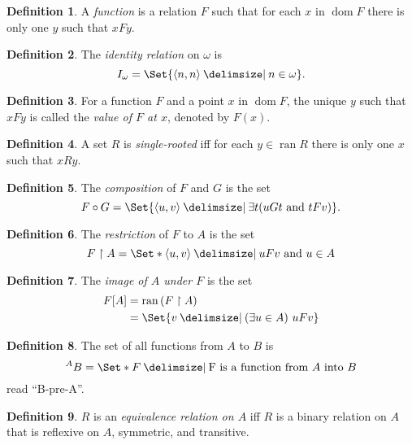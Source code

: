 \documentclass[12pt]{article}
\theoremstyle{plain}
\theoremstyle{remark}
\theoremstyle{definition}
\newtheorem{defn}{Definition}[section]
\theoremstyle{remark}
\providecommand\st{}
\newcommand\SetSymbol[1][]{%
  \nonscript\:#1\vert%
  \allowbreak%
  \nonscript\:
\mathopen{}}
\DeclarePairedDelimiter{\ang}{\langle}{\rangle}
\renewcommand\st{\SetSymbol[\delimsize]}
\DeclareMathOperator{\dom}{dom}
\DeclareMathOperator{\ran}{ran}
\begin{document}
\begin{defn}
  A \textit{function} is a relation $F$ such that for each $x$ in $\dom F$ there is only one $y$ such that $xFy$.
\end{defn}

\begin{defn}
  The \textit{identity relation} on $\omega$ is
  \[
  I_\omega = \Set{\ang{n,n} \st n \in \omega}.
  \]
\end{defn}

\begin{defn}
  For a function $F$ and a point $x$ in $\dom F$, the unique $y$ such that $xFy$ is called the \textit{value of $F$ at $x$}, denoted by $F(x)$.
\end{defn}

\begin{defn}
  A set $R$ is \textit{single-rooted} iff for each $y \in \ran R$ there is only one $x$ such that $xRy$.
\end{defn}

\begin{defn}
  The \textit{composition} of $F$ and $G$ is the set
  \[
    F \circ G = \Set{\ang{u, v} \st \exists t (uGt \text{ and } tFv)}.
  \]
\end{defn}

\begin{defn}
  The \textit{restriction} of $F$ to $A$ is the set
  \[
    F \restriction A = \Set*{\ang{u,v} \st uFv \text{ and } u \in A}
  \]
\end{defn}

\begin{defn}
  The \textit{image of $A$ under $F$} is the set
  \begin{align*}
    F [A] &= \ran{(F \restriction A)}\\
          &= \Set{v \st (\exists u \in A)\ uFv}
  \end{align*}
\end{defn}

\begin{defn}
  The set of all functions from $A$ to $B$ is
  \[
    ^A B = \Set*{F \st \text{F is a function from $A$ into $B$}}
  \]
  read ``B-pre-A''.
\end{defn}

\begin{defn}
  $R$ is an \textit{equivalence relation on $A$} iff $R$ is a binary relation on $A$ that is reflexive on $A$, symmetric, and transitive.
\end{defn}
\end{document}
